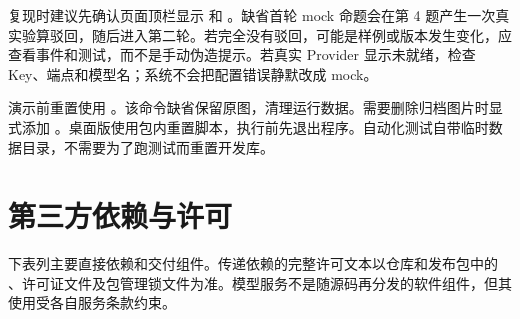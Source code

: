 复现时建议先确认页面顶栏显示  和 。缺省首轮 mock 命题会在第 4 题产生一次真实验算驳回，随后进入第二轮。若完全没有驳回，可能是样例或版本发生变化，应查看事件和测试，而不是手动伪造提示。若真实 Provider 显示未就绪，检查 Key、端点和模型名；系统不会把配置错误静默改成 mock。

演示前重置使用 。该命令缺省保留原图，清理运行数据。需要删除归档图片时显式添加 。桌面版使用包内重置脚本，执行前先退出程序。自动化测试自带临时数据目录，不需要为了跑测试而重置开发库。

\section{第三方依赖与许可}

下表列主要直接依赖和交付组件。传递依赖的完整许可文本以仓库和发布包中的 、许可证文件及包管理锁文件为准。模型服务不是随源码再分发的软件组件，但其使用受各自服务条款约束。

